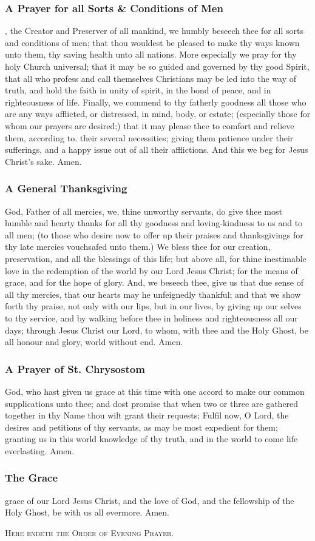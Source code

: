 \subsubsection{A Prayer for all Sorts \& Conditions of Men}
, the Creator and Preserver of all mankind, we humbly beseech thee for all sorts and conditions of men; that thou wouldest be pleased to make thy ways known unto them, thy saving health unto all nations. More especially we pray for thy holy Church universal; that it may be so guided and governed by thy good Spirit, that all who profess and call themselves Christians may be led into the way of truth, and hold the faith in unity of spirit, in the bond of peace, and in righteousness of life. Finally, we commend to thy fatherly goodness all those who are any ways afflicted, or distressed, in mind, body, or estate; (especially those for whom our prayers are desired;) that it may please thee to comfort and relieve them, according to. their several necessities; giving them patience under their sufferings, and a happy issue out of all their afflictions. And this we beg for Jesus Christ's sake. Amen.
\subsubsection{A General Thanksgiving}
 God, Father of all mercies, we, thine unworthy servants, do give thee most humble and hearty thanks for all thy goodness and loving-kindness to us and to all men; (to those who desire now to offer up their praises and thanksgivings for thy late mercies vouchsafed unto them.) We bless thee for our creation, preservation, and all the blessings of this life; but above all, for thine inestimable love in the redemption of the world by our Lord Jesus Christ; for the means of grace, and for the hope of glory. And, we beseech thee, give us that due sense of all thy mercies, that our hearts may he unfeignedly thankful; and that we show forth thy praise, not only with our lips, but in our lives, by giving up our selves to thy service, and by walking before thee in holiness and righteousness all our days; through Jesus Christ our Lord, to whom, with thee and the Holy Ghost, be all honour and glory, world without end. Amen.
\subsubsection{A Prayer of St. Chrysostom}
 God, who hast given us grace at this time with one accord to make our common supplications unto thee; and dost promise that when two or three are gathered together in thy Name thou wilt grant their requests; Fulfil now, O Lord, the desires and petitions of thy servants, as may be most expedient for them; granting us in this world knowledge of thy truth, and in the world to come life everlasting. Amen.
\subsubsection{The Grace}
 grace of our Lord Jesus Christ, {} and the love of God, and the fellowship of the Holy Ghost, be with us all evermore. Amen.\par
\begin{center}
	\textsc{Here endeth the Order of Evening Prayer.}
\end{center}